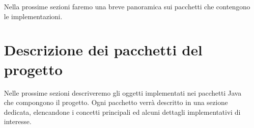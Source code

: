\documentclass[twoside,openright,titlepage,fleqn,
	headinclude,11pt,a4paper,BCOR5mm,footinclude
	]{scrbook}
\begin{document}


% 

Nella prossime sezioni faremo una breve panoramica sui pacchetti che
contengono le implementazioni.

\section{Descrizione dei pacchetti del progetto}
\label{section:packages-descriptions}

Nelle prossime sezioni descriveremo gli oggetti implementati nei
pacchetti Java che compongono il progetto. Ogni pacchetto verr\`a
descritto in una sezione dedicata, elencandone i concetti principali
ed alcuni dettagli implementativi di interesse.







% 


\end{document}
